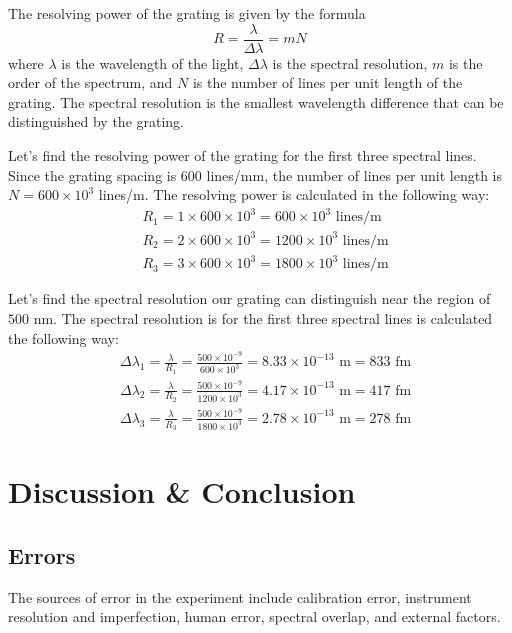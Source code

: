 \documentclass[10pt]{article}
\begin{document}
The resolving power of the grating is given by the formula
\begin{equation}
  R = \frac{\lambda}{\Delta \lambda} = mN
  \label{eq:2}
\end{equation}
where $\lambda$ is the wavelength of the light, $\Delta \lambda$ is the spectral resolution, $m$ is the order of the spectrum, and $N$ is the number of lines per unit length of the grating. The spectral resolution is the smallest wavelength difference that can be distinguished by the grating. 

Let's find the resolving power of the grating for the first three spectral lines. Since the grating spacing is $600$ lines/mm, the number of lines per unit length is $N = 600 \times 10^3$ lines/m. The resolving power is calculated in the following way:
\begin{align}
  &R_1 = 1 \times 600 \times 10^3 = 600 \times 10^3 \text{ lines/m} \\
  &R_2 = 2 \times 600 \times 10^3 = 1200 \times 10^3 \text{ lines/m} \\
  &R_3 = 3 \times 600 \times 10^3 = 1800 \times 10^3 \text{ lines/m}
\end{align}

Let's find the spectral resolution our grating can distinguish near the region of $500$ nm. The spectral resolution is for the first three spectral lines is calculated the following way:
\begin{align}
  &\Delta \lambda_1 = \frac{\lambda}{R_1} = \frac{500 \times 10^{-9}}{600 \times 10^3} = 8.33 \times 10^{-13} \text{ m} = 833 \text{ fm} \\
  &\Delta \lambda_2 = \frac{\lambda}{R_2} = \frac{500 \times 10^{-9}}{1200 \times 10^3} = 4.17 \times 10^{-13} \text{ m} = 417 \text{ fm} \\
  &\Delta \lambda_3 = \frac{\lambda}{R_3} = \frac{500 \times 10^{-9}}{1800 \times 10^3} = 2.78 \times 10^{-13} \text{ m} = 278 \text{ fm}
\end{align}

\section{Discussion \& Conclusion}

\subsection*{Errors}

The sources of error in the experiment include calibration error, instrument resolution and imperfection, human error, spectral overlap, and external factors.
\end{document}
